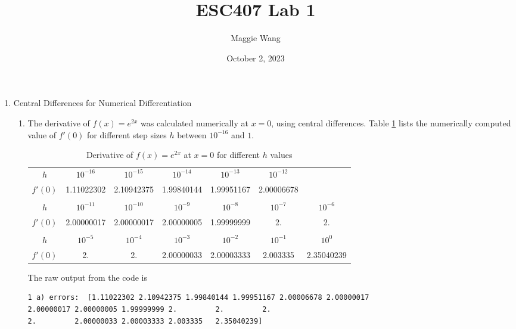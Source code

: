 \documentclass{article}
\begin{document}
\title{ESC407 Lab 1}

\author{Maggie Wang}

\date{October 2, 2023}
\maketitle

\begin{enumerate}
\item Central Differences for Numerical Differentiation
\begin{enumerate}
    \item The derivative of $f(x)=e^{2x}$ was calculated numerically at $x=0$, using central differences. 
    Table \ref{tab:1a} lists the numerically computed value of $f'(0)$ for different step sizes $h$ between $10^{-16}$ and $1$.
    
    \begin{table}[h]
        \centering
        \begin{tabular}{c|c c c c c c}
            $h$ & $10^{-16}$ & $10^{-15}$ & $10^{-14}$ & $10^{-13}$ & 
            $10^{-12}$ \\ 
            $f'(0)$ & 1.11022302 & 2.10942375 & 1.99840144 & 1.99951167 &
            2.00006678 \\  [0.2 em] \hline  \\[-0.8em]
            $h$ & $10^{-11}$ & $10^{-10}$ & $10^{-9}$ & $10^{-8}$ & 
            $10^{-7}$ & $10^{-6}$ \\ 
            $f'(0)$ & 2.00000017 & 2.00000017 & 2.00000005 & 1.99999999 & 2. & 2. \\ [0.2 em] \hline  \\[-0.8em]
            $h$ & $10^{-5}$ & $10^{-4}$ & $10^{-3}$ & $10^{-2}$ & $10^{-1}$ & $10^{0}$\\
            $f'(0)$  & 2. & 2. & 2.00000033 & 2.00003333 & 2.003335 & 2.35040239
        \end{tabular}
        \caption{Derivative of $f(x)=e^{2x}$ at $x=0$ for different $h$ values}
        \label{tab:1a}
    \end{table}

    The raw output from the code is 
    \begin{verbatim}
1 a) errors:  [1.11022302 2.10942375 1.99840144 1.99951167 2.00006678 2.00000017
2.00000017 2.00000005 1.99999999 2.         2.         2.
2.         2.00000033 2.00003333 2.003335   2.35040239]
    \end{verbatim}


\end{enumerate}
\end{enumerate}
\end{document}
